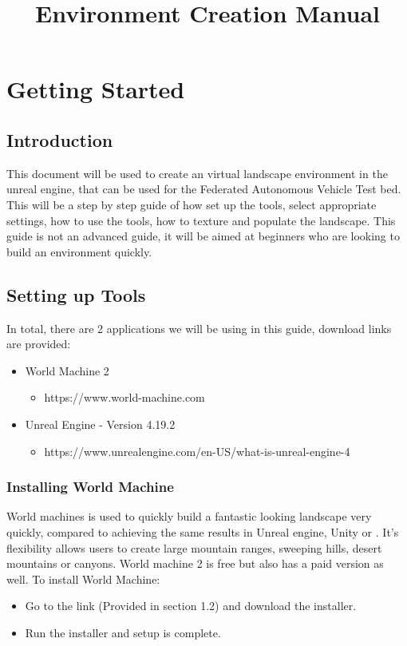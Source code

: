 \documentclass[../main.tex]{subfiles}
\title{Environment Creation Manual}
\begin{document}
 
\section{Getting Started}
\subsection{Introduction}
This document will be used to create an virtual landscape environment in the unreal engine, that can be used for the Federated Autonomous Vehicle Test bed.
This will be a step by step guide of how set up the tools, select appropriate settings, how to use the tools, how to texture and  populate the landscape.
This guide is not an advanced guide, it will be aimed at beginners who are looking to build an environment quickly.

\subsection{Setting up Tools}
In total, there are 2 applications we will be using in this guide, download links are provided:
\begin{itemize}
    \item World Machine 2
    \begin{itemize}
        \item https://www.world-machine.com 
    \end{itemize}
    
    \item Unreal Engine - Version 4.19.2
    \begin{itemize}
        \item https://www.unrealengine.com/en-US/what-is-unreal-engine-4  
    \end{itemize}

\end{itemize}
    
\subsubsection{Installing World Machine}
World machines is used to quickly build a fantastic looking landscape very quickly, compared to achieving the same results in Unreal engine, Unity or . It’s flexibility allows users to create large mountain ranges, sweeping hills, desert mountains or canyons. World machine 2 is free but also has a paid version as well.
To install World Machine:
\begin{itemize}
        \item Go to the link (Provided in section 1.2) and download the installer.
        \item  Run the installer and setup is complete.
\end{itemize}
\end{document}
